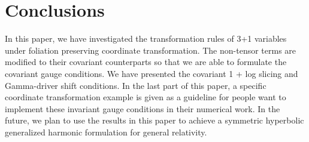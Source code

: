 \documentclass[letterpaper,nofootinbib,prd,amsmath,onecolumn]{revtex4-1}
\begin{document}
\section{Conclusions}
In this paper, we have investigated the transformation rules of 3+1 variables under foliation preserving coordinate transformation. The non-tensor terms are modified to their covariant counterparts so that we are able to formulate the covariant gauge conditions. We have presented the covariant 1 + log slicing and Gamma-driver shift conditions. In the last part of this paper, a specific coordinate transformation example is given as a guideline for people want to implement these invariant gauge conditions in their numerical work. In the future, we plan to use the results in this paper to achieve a symmetric hyperbolic generalized harmonic formulation for general relativity.  



\end{document}
